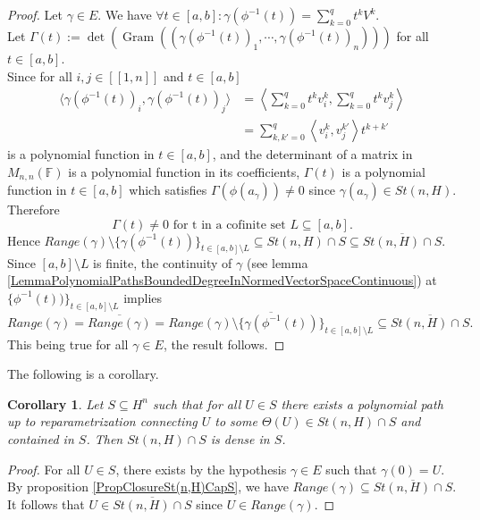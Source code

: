 \documentclass[a4paper,12pt]{article}
\DeclareMathOperator{\Gram}{Gram}
\theoremstyle{plain}
\newtheorem{corollary}{Corollary}[section]
\theoremstyle{definition}
\theoremstyle{remark}
\begin{document}
\begin{proof}
Let $\gamma \in E$.  We have $\forall t \in [a,b] : \gamma(\phi^{-1}(t)) = \sum_{k=0}^q t^k V^k$. \\
Let $\Gamma(t) := \det(\Gram((\gamma(\phi^{-1}(t))_1, \cdots, \gamma(\phi^{-1}(t))_n)))$ for all $t \in [a,b]$. \\
Since for all $i,j \in [\![1,n]\!]$ and $t \in [a,b]$
\begin{align*}
\langle \gamma(\phi^{-1}(t))_i , \gamma(\phi^{-1}(t))_j \rangle &= \left \langle \sum_{k=0}^q t^k v_i^k , \sum_{k=0}^q t^k v_j^k \right\rangle \\
&= \sum_{k,k'=0}^q \left\langle v_i^k, v_j^{k'} \right\rangle t^{k+k'}
\end{align*} 
is a polynomial function in $t \in [a,b]$, and the determinant of a matrix in $M_{n,n}(\mathbb{F})$ is a polynomial function in its coefficients, $\Gamma(t)$ is a polynomial function in $t \in [a,b]$ which satisfies $\Gamma(\phi(a_\gamma)) \neq 0$ since $\gamma(a_\gamma) \in St(n,H)$. Therefore
\[ \Gamma(t) \neq 0 \text{ for t in a cofinite set } L \subseteq [a,b]. \]
Hence $Range(\gamma) \setminus \{\gamma(\phi^{-1}(t))\}_{t \in [a,b] \setminus L} \subseteq St(n,H) \cap S \subseteq \overline{ St(n,H) \cap S }$.
Since $[a,b] \setminus L$ is finite, the continuity of $\gamma$ (see lemma \ref{LemmaPolynomialPathsBoundedDegreeInNormedVectorSpaceContinuous}) at $\{ \phi^{-1}(t))\}_{t \in [a,b] \setminus L}$ implies 
\[ Range(\gamma) = \overline{Range(\gamma)} = \overline{Range(\gamma) \setminus \{\gamma(\phi^{-1}(t))\}_{t \in [a,b] \setminus L} } \subseteq \overline{ St(n,H) \cap S }. \]
This being true for all $\gamma \in E$, the result follows.
\end{proof}

The following is a corollary.

\begin{corollary}
\label{CorSt(n,H)CapSDenseInS}
Let $S \subseteq H^n$ such that for all $U \in S$ there exists a polynomial path up to reparametrization connecting $U$ to some $\Theta(U) \in St(n,H) \cap S$ and contained in $S$. Then $St(n,H) \cap S$ is dense in $S$.
\end{corollary}

\begin{proof}
For all $U \in S$, there exists by the hypothesis $\gamma \in E$ such that $\gamma(0) = U$. By proposition \ref{PropClosureSt(n,H)CapS}, we have $Range(\gamma) \subseteq \overline{St(n,H) \cap S}$. It follows that $U \in \overline{St(n,H) \cap S}$ since $U \in Range(\gamma)$.
\end{proof}
\end{document}
